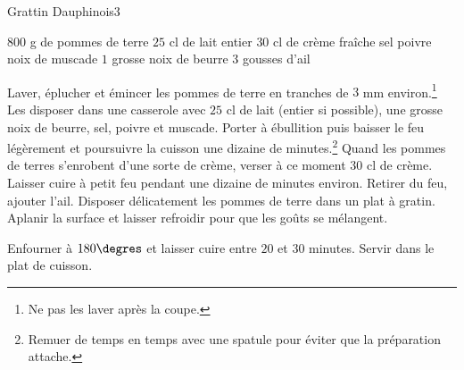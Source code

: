 \begin{recette}{Grattin Dauphinois}{3}{}{}
\begin{ingredients}
\ingredient $800$ g de pommes de terre
\ingredient $25$ cl de lait entier
\ingredient $30$ cl de crème fraîche
\ingredient sel
\ingredient poivre
\ingredient noix de muscade
\ingredient $1$ grosse noix de beurre
\ingredient $3$ gousses d'ail
\end{ingredients}

\begin{preparation}
\etape Laver, éplucher et émincer les pommes de terre en tranches de $3$ mm environ.\footnote{Ne pas les laver après la coupe.}
\etape Les disposer dans une casserole avec $25$ cl de lait (entier si possible), une grosse noix de beurre, sel, poivre et muscade.
\etape Porter à ébullition puis baisser le feu légèrement et poursuivre la cuisson une dizaine de minutes.\footnote{Remuer de temps en temps avec une spatule pour éviter que la préparation attache.}
\etape Quand les pommes de terres s'enrobent d'une sorte de crème, verser à ce moment $30$ cl de crème.
\etape Laisser cuire à petit feu pendant une dizaine de minutes environ.
\etape Retirer du feu, ajouter l'ail.
\etape Disposer délicatement les pommes de terre dans un plat à gratin.
\etape Aplanir la surface et laisser refroidir pour que les goûts se mélangent.
\end{preparation}

\begin{cuisson}
Enfourner à $180\degres$ et laisser cuire entre $20$ et $30$ minutes. Servir dans le plat de cuisson.
\end{cuisson}
\end{recette}

